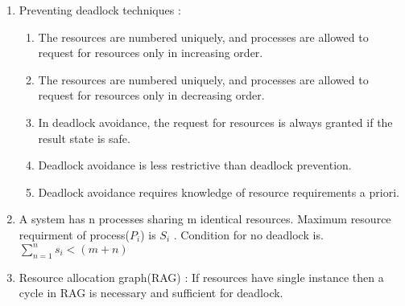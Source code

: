 \begin{enumerate}
  \item Preventing deadlock techniques :
  \begin{enumerate}
    \item The resources are numbered uniquely, and processes are allowed to request for resources only in increasing order.
    \item The resources are numbered uniquely, and processes are allowed to request for resources only in decreasing order.
    \item In deadlock avoidance, the request for resources is always granted if the result state is safe.
    \item Deadlock avoidance is less restrictive than deadlock prevention.
    \item Deadlock avoidance requires knowledge of resource requirements a priori.
  \end{enumerate}

  \item A system has n processes sharing m identical resources. Maximum resource requirment of process(\(P_i\)) is  \(S_i\) .
        Condition for no deadlock is. \\
        {\large \(   \sum_{n=1}^{n} s_i < (m+n)   \) }

  \item Resource allocation graph(RAG) : If resources have single instance then a cycle in RAG is necessary
        and sufficient for deadlock.

\end{enumerate}








